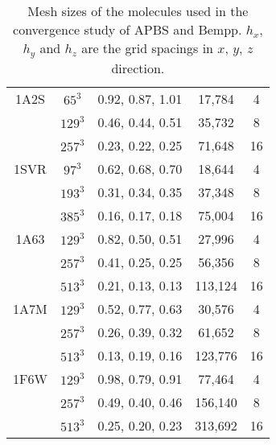 \documentclass[11pt]{article}
\begin{document}
\begin{table}[]
\begin{tabular}{c|cc|cc}
  1A2S & $65^3$     & 0.92, 0.87, 1.01                 & 17,784     & 4                              \\
       & $129^3$    & 0.46, 0.44, 0.51                 & 35,732     & 8                              \\
       & $257^3$    & 0.23, 0.22, 0.25                 & 71,648     & 16                             \\ \hline
  1SVR & $97^3$     & 0.62, 0.68, 0.70                 & 18,644     & 4                              \\
       & $193^3$    & 0.31, 0.34, 0.35                 & 37,348     & 8                              \\
       & $385^3$    & 0.16, 0.17, 0.18                 & 75,004     & 16                             \\ \hline
  1A63 & $129^3$    & 0.82, 0.50, 0.51                 & 27,996     & 4                              \\
       & $257^3$    & 0.41, 0.25, 0.25                 & 56,356     & 8                              \\
       & $513^3$    & 0.21, 0.13, 0.13                 & 113,124    & 16                             \\ \hline
  1A7M & $129^3$    & 0.52, 0.77, 0.63                 & 30,576     & 4                              \\
       & $257^3$    & 0.26, 0.39, 0.32                 & 61,652     & 8                              \\
       & $513^3$    & 0.13, 0.19, 0.16                 & 123,776    & 16                             \\ \hline
  1F6W & $129^3$    & 0.98, 0.79, 0.91                 & 77,464     & 4                              \\
       & $257^3$    & 0.49, 0.40, 0.46                 & 156,140    & 8                              \\
       & $513^3$    & 0.25, 0.20, 0.23                 & 313,692    & 16                            
  \end{tabular}
  \caption{Mesh sizes of the molecules used in the convergence study of APBS and Bempp.
  $h_x$, $h_y$ and $h_z$ are the grid spacings in $x$, $y$, $z$ direction.}
  \label{tab:APBS_mesh}
\end{table}
\end{document}
